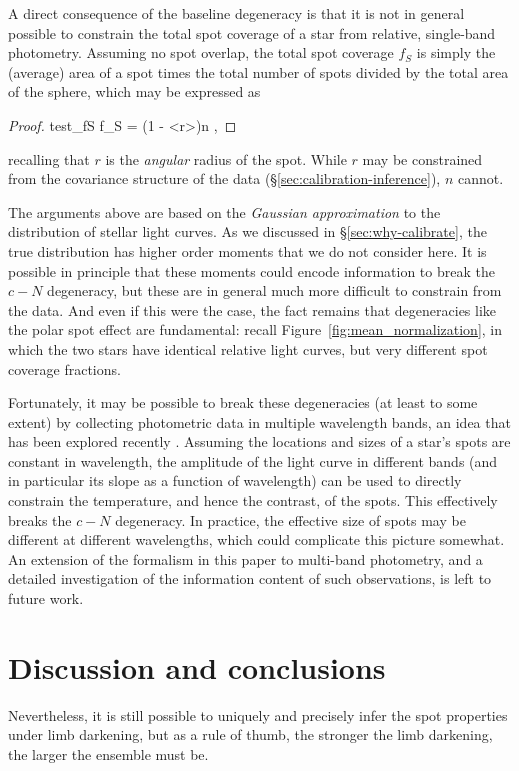 \documentclass[modern]{aastex62}
\begin{document}
A direct consequence of the baseline degeneracy is that it is not in general
possible to constrain the total spot coverage of a star from relative,
single-band photometry. Assuming no spot overlap, the total spot coverage $f_S$ is simply the (average) area of a spot
times the total number of spots divided by the total area of the sphere, which
may be expressed as
%
\begin{proof}{test_fS}
    \label{eq:fS}
    f_S = \left(1 - \left<\cos r\right>\right)n
    \quad,
\end{proof}
%
recalling that $r$ is the \emph{angular} radius of the spot.
While $r$ may be constrained from the covariance structure of the data
(\S\ref{sec:calibration-inference}), $n$ cannot.

The arguments above are based on the \emph{Gaussian approximation} to the
distribution of stellar light curves. As we discussed in \S\ref{sec:why-calibrate},
the true distribution has higher order moments that we do not consider here.
It is possible in principle that these moments could encode information to
break the $c-N$ degeneracy, but these are in general much more difficult
to constrain from the data. And even if this were the case, the fact remains
that degeneracies like the polar spot effect are fundamental: recall
Figure~\ref{fig:mean_normalization}, in which the two stars
have identical relative light curves, but very different spot coverage
fractions.

Fortunately, it may be possible to break these degeneracies (at least to some extent)
by collecting photometric data in multiple wavelength bands, an idea that has
been explored recently \citep[e.g.,][]{Gully2017,Guo2018}. Assuming the
locations and sizes of a star's spots are constant in wavelength, the amplitude
of the light curve in different bands (and in particular its slope as a function
of wavelength) can be used to directly constrain the
temperature, and hence the contrast, of the spots. This effectively breaks the
$c-N$ degeneracy. In practice, the effective size of spots may be different
at different wavelengths, which could complicate this picture somewhat. An extension
of the formalism in this paper to multi-band photometry, and a detailed investigation
of the information content of such observations, is left to future work.

\section{Discussion and conclusions}


Nevertheless, it is still possible to uniquely and precisely infer the spot properties
under limb darkening,
but as a rule of thumb, the stronger the limb darkening, the larger the
ensemble must be.


\end{document}
